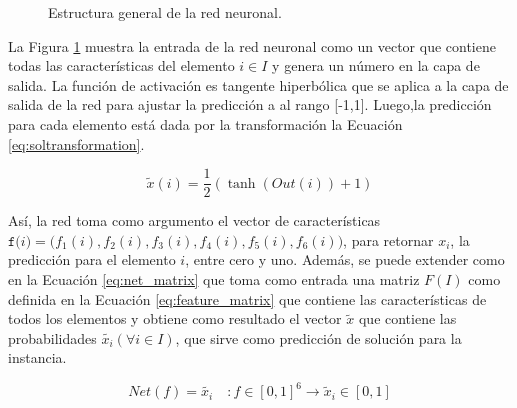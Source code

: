 \documentclass[spanish, a4paper, 12pt, openany,final]{book}
\begin{document}
\begin{figure}[H]
		\caption{Estructura general de la red neuronal.}
		\label{fig:network}
	\end{figure}


La Figura \ref{fig:network} muestra la entrada de la red neuronal como un vector que contiene todas las características del elemento $i \in I$ y genera un número en la capa de salida. La función de activación es tangente hiperbólica que se aplica a la capa de salida de la red para ajustar la predicción a al rango [-1,1]. Luego,la predicción para cada elemento está dada por la  transformación la Ecuación \eqref{eq:soltransformation}. 


\begin{equation}
	\tilde{x}(i) = \frac{1}{2}\left( \tanh(Out(i)) + 1 \right)
	\label{eq:soltransformation}	
\end{equation}


Así, la red toma como argumento el vector de características $\texttt{f($i$)} = \textbf{(}f_1(i),f_2(i),f_3(i),f_4(i),f_5(i),f_6(i)\textbf{)}$, para retornar $x_i$, la predicción para el elemento $i$, entre cero y uno. Además, se puede extender como en la Ecuación \eqref{eq:net_matrix} que toma como entrada una matriz $F(I)$ como  definida en la Ecuación \eqref{eq:feature_matrix} que contiene las características de todos los elementos y obtiene como resultado el vector $\tilde{x}$ que contiene las probabilidades $\tilde{x_i} (\forall i \in I)$, que sirve como predicción de solución para la instancia.

\begin{equation}
	\label{eq:net_vector}
	Net(f) = \tilde{x_i} \quad: f\in [0,1]^6 \rightarrow \tilde{x}_i \in[0,1]
\end{equation}
\end{document}
